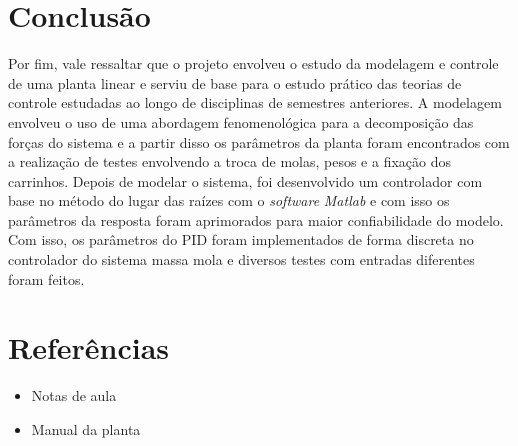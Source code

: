 \documentclass{ifacconf}
\begin{document}
\section{Conclusão}

Por fim, vale ressaltar que o projeto envolveu o estudo da modelagem e controle de uma planta linear e serviu de base para o estudo prático das teorias de controle estudadas ao longo de disciplinas de semestres anteriores. A modelagem envolveu o uso de uma abordagem fenomenológica para a decomposição das forças do sistema e a partir disso os parâmetros da planta foram encontrados com a realização de testes envolvendo a troca de molas, pesos e a fixação dos carrinhos. Depois de modelar o sistema, foi desenvolvido um controlador com base no método do lugar das raízes com o \textit{software} \textit{Matlab} e com isso os parâmetros da resposta foram aprimorados para maior confiabilidade do modelo. Com isso, os parâmetros do PID foram implementados de forma discreta no controlador do sistema massa mola e diversos testes com entradas diferentes foram feitos.  

\section{Referências}

\begin{itemize}
  \item Notas de aula
  \item Manual da planta
\end{itemize}
\end{document}
